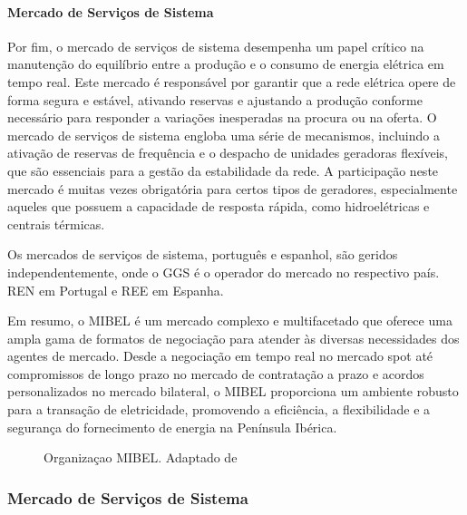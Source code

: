 \paragraph{Mercado de Serviços de Sistema \label{se:servicos_sistema_mibel}}
\text{ }  \par
Por fim, o mercado de serviços de sistema desempenha um papel crítico na manutenção do equilíbrio entre a produção e o consumo de energia elétrica em tempo real. Este mercado é responsável por garantir que a rede elétrica opere de forma segura e estável, ativando reservas e ajustando a produção conforme necessário para responder a variações inesperadas na procura ou na oferta. O mercado de serviços de sistema engloba uma série de mecanismos, incluindo a ativação de reservas de frequência e o despacho de unidades geradoras flexíveis, que são essenciais para a gestão da estabilidade da rede. A participação neste mercado é muitas vezes obrigatória para certos tipos de geradores, especialmente aqueles que possuem a capacidade de resposta rápida, como hidroelétricas e centrais térmicas.\par
Os mercados de serviços de sistema, português e espanhol, são geridos independentemente, onde o \gls{GGS} é o operador do mercado no respectivo país. \gls{REN} em Portugal e \gls{REE} em Espanha.\par
\bigskip
\bigskip
Em resumo, o \gls{MIBEL} é um mercado complexo e multifacetado que oferece uma ampla gama de formatos de negociação para atender às diversas necessidades dos agentes de mercado. Desde a negociação em tempo real no mercado spot até compromissos de longo prazo no mercado de contratação a prazo e acordos personalizados no mercado bilateral, o \gls{MIBEL} proporciona um ambiente robusto para a transação de eletricidade, promovendo a eficiência, a flexibilidade e a segurança do fornecimento de energia na Península Ibérica.\cite{Rassid2017}\par



\begin{figure}[H]
	\centering
	\resizebox{\linewidth}{!}{}
	\caption{Organizaçao MIBEL. Adaptado de \cite{Rassid2017}}
	\label{fig:mibel_org}
\end{figure}




\subsubsection{Mercado de Serviços de Sistema \label{se:servicos_sistema}}

